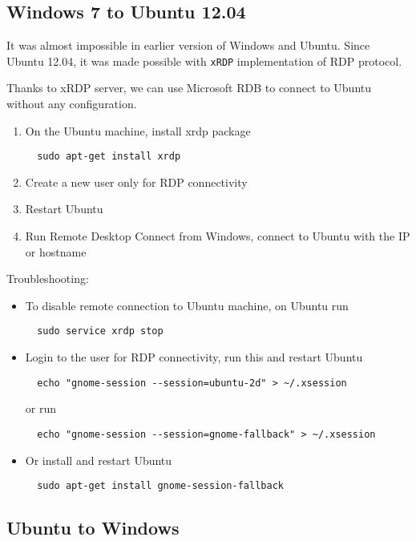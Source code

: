 \subsection{Windows 7 to Ubuntu 12.04}
\label{sec:RDP-Windows-to-Ubuntu}

It was almost impossible in earlier version of Windows and Ubuntu. Since Ubuntu
12.04, it was made possible with \verb!xRDP! implementation of RDP protocol.

Thanks to xRDP server, we can use Microsoft RDB to connect to Ubuntu without any
configuration. 

\begin{enumerate}
  \item On the Ubuntu machine, install xrdp package
  \begin{verbatim}
  sudo apt-get install xrdp
  \end{verbatim}
  \item Create a new user only for RDP connectivity
  \item Restart Ubuntu
  \item Run Remote Desktop Connect from Windows, connect to Ubuntu with the IP
  or hostname
\end{enumerate}

Troubleshooting:
\begin{itemize}
  \item To disable remote connection to Ubuntu machine, on Ubuntu run
  \begin{verbatim}
  sudo service xrdp stop
  \end{verbatim}
  
  \item Login to the user for RDP connectivity, run this and restart Ubuntu
  \begin{verbatim}
  echo "gnome-session --session=ubuntu-2d" > ~/.xsession
  \end{verbatim}
  or run
  \begin{verbatim}
  echo "gnome-session --session=gnome-fallback" > ~/.xsession
  \end{verbatim}
  
  \item Or install and restart Ubuntu
  \begin{verbatim}
  sudo apt-get install gnome-session-fallback 
  \end{verbatim}
\end{itemize}

\subsection{Ubuntu to Windows}
\label{sec:RDP-Ubuntu-to-Windows}

